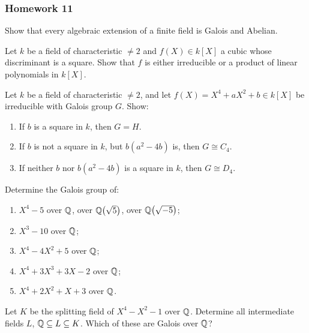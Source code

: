 \subsubsection{Homework 11}
\setcounter{exercise}{0}
\setcounter{equation}{0}

\begin{problem}
  Show that every algebraic extension of a finite field is Galois and
  Abelian.
\end{problem}
\begin{solution}
\end{solution}

\begin{problem}
  Let $k$ be a field of characteristic $\neq 2$ and $f(X)\in k[X]$ a
  cubic whose discriminant is a square. Show that $f$ is either irreducible
  or a product of linear polynomials in $k[X]$.
\end{problem}
\begin{solution}
\end{solution}

\begin{problem}
  Let $k$ be a field of characteristic $\neq 2$, and let
  $f(X)=X^4+aX^2+b\in k[X]$ be irreducible with Galois group $G$. Show:
  \begin{enumerate}[label=(\roman*),noitemsep]
  \item If $b$ is a square in $k$, then $G=H$.
  \item If $b$ is not a square in $k$, but $b(a^2-4b)$ is, then
    $G\cong C_4$.
  \item If neither $b$ nor $b(a^2-4b)$ is a square in $k$, then
    $G\cong D_4$.
  \end{enumerate}
\end{problem}
\begin{solution}
\end{solution}

\begin{problem}
  Determine the Galois group of:
  \begin{enumerate}[label=(\alph*),noitemsep]
  \item $X^4-5$ over $\mathbb{Q}$, over $\mathbb{Q}\bigl(\sqrt{5}\bigr)$, over
    $\mathbb{Q}\bigl(\sqrt{-5}\bigr)$;
  \item $X^3-10$ over $\mathbb{Q}$;
  \item $X^4-4X^2+5$ over $\mathbb{Q}$;
  \item $X^4+3X^3+3X-2$ over $\mathbb{Q}$;
  \item $X^4+2X^2+X+3$ over $\mathbb{Q}$.
  \end{enumerate}
\end{problem}
\begin{solution}
\end{solution}

\begin{problem}
  Let $K$ be the splitting field of $X^4-X^2-1$ over $\mathbb{Q}$. Determine
  all intermediate fields $L$, $\mathbb{Q}\subseteq L\subseteq K$. Which of
  these are Galois over $\mathbb{Q}$?
\end{problem}
\begin{solution}
\end{solution}


